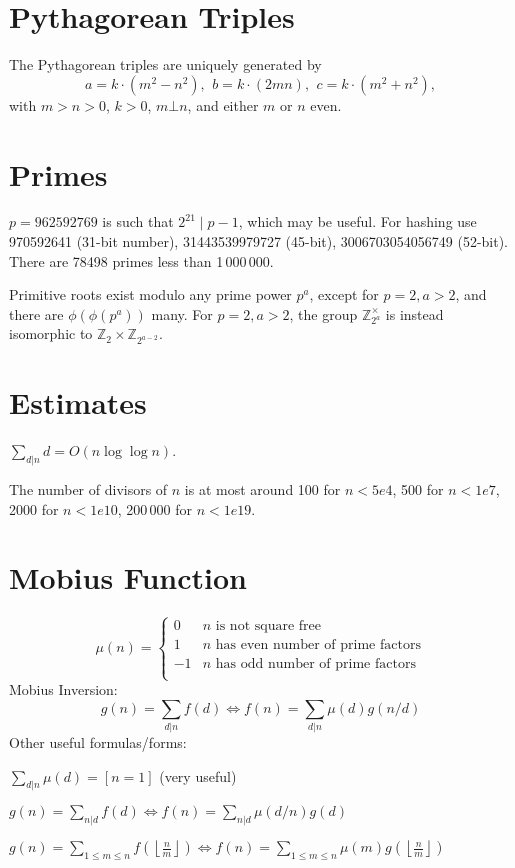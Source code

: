     \section{Pythagorean Triples}
 The Pythagorean triples are uniquely generated by
 \[ a=k\cdot (m^{2}-n^{2}),\ \,b=k\cdot (2mn),\ \,c=k\cdot (m^{2}+n^{2}), \]
 with $m > n > 0$, $k > 0$, $m \bot n$, and either $m$ or $n$ even.

\section{Primes}
	$p=962592769$ is such that $2^{21} \mid p-1$, which may be useful. For hashing
	use 970592641 (31-bit number), 31443539979727 (45-bit), 3006703054056749
	(52-bit). There are 78498 primes less than 1\,000\,000.

	Primitive roots exist modulo any prime power $p^a$, except for $p = 2, a > 2$, and there are $\phi(\phi(p^a))$ many.
	For $p = 2, a > 2$, the group $\mathbb Z_{2^a}^\times$ is instead isomorphic to $\mathbb Z_2 \times \mathbb Z_{2^{a-2}}$.

\section{Estimates}
	$\sum_{d|n} d = O(n \log \log n)$.

	The number of divisors of $n$ is at most around 100 for $n < 5e4$, 500 for $n < 1e7$, 2000 for $n < 1e10$, 200\,000 for $n < 1e19$.

\section{Mobius Function}
\[
	\mu(n) = \begin{cases} 0 & n \textrm{ is not square free}\\ 1 & n \textrm{ has even number of prime factors}\\ -1 & n \textrm{ has odd number of prime factors}\\\end{cases}
\]
  Mobius Inversion:
  \[ g(n) = \sum_{d|n} f(d) \Leftrightarrow f(n) = \sum_{d|n} \mu(d)g(n/d) \]
  Other useful formulas/forms:

  $ \sum_{d | n} \mu(d) = [ n = 1] $ (very useful)

  $ g(n) = \sum_{n|d} f(d) \Leftrightarrow f(n) = \sum_{n|d} \mu(d/n)g(d)$

 $ g(n) = \sum_{1 \leq m \leq n} f(\left\lfloor\frac{n}{m}\right \rfloor ) \Leftrightarrow f(n) = \sum_{1\leq m\leq n} \mu(m)g(\left\lfloor\frac{n}{m}\right\rfloor)$


